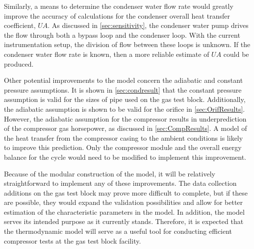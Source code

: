 Similarly, a means to determine the condenser water flow rate would
greatly improve the accuracy of calculations for the condenser overall heat transfer coefficient, $UA$.
As discussed in \cref{sec:sensitivity}, the condenser water pump drives the
flow through both a bypass loop and the condenser loop. With the current instrumentation
setup, the division of flow between these loops is unknown.
If the condenser water flow rate is known, then a more reliable
estimate of $UA$ could be produced.

Other potential improvements to the model concern the adiabatic and constant pressure assumptions.
It is shown in \cref{sec:condresult} that the constant pressure assumption is valid for the sizes
of pipe used on the gas test block.
Additionally, the adiabatic assumption is shown to be valid for the orifice in \cref{sec:OrifResults}.
However, the adiabatic assumption for the compressor results in underprediction of the compressor
gas horsepower, as discussed in \cref{sec:CompResults}.
A model of the heat transfer from the compressor casing to the ambient conditions is likely to
improve this prediction.
Only the compressor module and the overall energy balance 
for the cycle would need to be modified to implement this improvement.

Because of the modular construction of the model, it will be relatively 
straightforward to implement any of these improvements.
The data collection additions on the gas test block may prove more difficult to complete,
but if these are possible, they would expand the validation possibilities 
and allow for better estimation of the characteristic parameters in the model.
In addition, the model serves its intended purpose as it currently stands.
Therefore, it is expected that the thermodynamic model will serve as a useful
tool for conducting efficient compressor tests at the  gas
test block facility.\enlargethispage{\baselineskip}